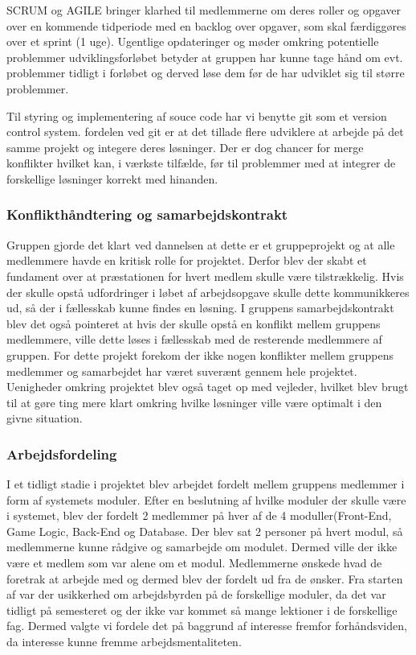SCRUM og AGILE bringer klarhed til medlemmerne om deres roller og opgaver over en 
kommende tidperiode med en backlog over opgaver, som skal færdiggøres over et sprint (1 uge).
Ugentlige opdateringer og møder omkring potentielle problemmer udviklingsforløbet betyder
at gruppen har kunne tage hånd om evt. problemmer tidligt i forløbet og derved løse dem
før de har udviklet sig til større problemmer.

Til styring og implementering af souce code har vi benytte git som et version control system.
fordelen ved git er at det tillade flere udviklere at arbejde på det samme projekt og integere 
deres løsninger. Der er dog chancer for merge konflikter hvilket kan, i værkste tilfælde, før
til problemmer med at integrer de forskellige løsninger korrekt med hinanden.

\subsubsection{Konflikthåndtering og samarbejdskontrakt}
Gruppen gjorde det klart ved dannelsen at dette er et gruppeprojekt og at alle medlemmere havde en kritisk rolle for projektet. Derfor blev der skabt et fundament over at præstationen for hvert medlem skulle være tilstrækkelig. Hvis der skulle opstå udfordringer i løbet af arbejdsopgave skulle dette kommunikkeres ud, så der i fællesskab kunne findes en løsning. I gruppens samarbejdskontrakt blev det også pointeret at hvis der skulle opstå en konflikt mellem gruppens medlemmere, ville dette løses i fællesskab med de resterende medlemmere af gruppen. For dette projekt forekom der ikke nogen konflikter mellem gruppens medlemmer og samarbejdet har været suverænt gennem hele projektet. Uenigheder omkring projektet blev også taget op med vejleder, hvilket blev brugt til at gøre ting mere klart omkring hvilke løsninger ville være optimalt i den givne situation. 

\subsubsection{Arbejdsfordeling}
I et tidligt stadie i projektet blev arbejdet fordelt mellem gruppens medlemmer i form af systemets moduler. Efter en beslutning af hvilke moduler der skulle være i systemet, blev der fordelt 2 medlemmer på hver af de 4 moduller(Front-End, Game Logic, Back-End og Database. Der blev sat 2 personer på hvert modul, så medlemmerne kunne rådgive og samarbejde om modulet. Dermed ville der ikke være et medlem som var alene om et modul. Medlemmerne ønskede hvad de foretrak at arbejde med og dermed blev der fordelt ud fra de ønsker. Fra starten af var der usikkerhed om arbejdsbyrden på de forskellige moduler, da det var tidligt på semesteret og der ikke var kommet så mange lektioner i de forskellige fag. Dermed valgte vi fordele det på baggrund af interesse fremfor forhåndsviden, da interesse kunne fremme arbejdsmentaliteten. 

